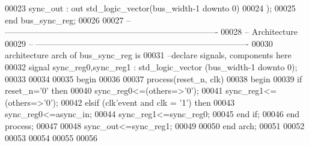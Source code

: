 \begin{DoxyCode}
00023       \textcolor{vhdlchar}{sync_out}    \textcolor{vhdlchar}{:} \textcolor{keywordflow}{out} \textcolor{comment}{std\_logic\_vector}\textcolor{vhdlchar}{(}\textcolor{vhdlchar}{bus_width}\textcolor{vhdlchar}{-}\textcolor{vhdllogic}{}\textcolor{vhdllogic}{1} \textcolor{keywordflow}{downto} \textcolor{vhdllogic}{}\textcolor{vhdllogic}{0}\textcolor{vhdlchar}{)}
00024         \textcolor{vhdlchar}{)};
00025 \textcolor{keywordflow}{end} \textcolor{vhdlchar}{bus\_sync\_reg};
00026 
00027 \textcolor{keyword}{-- ----------------------------------------------------------------------------}
00028 \textcolor{keyword}{-- Architecture}
00029 \textcolor{keyword}{-- ----------------------------------------------------------------------------}
00030 \textcolor{keywordflow}{architecture} arch \textcolor{keywordflow}{of} bus_sync_reg is
00031 \textcolor{keyword}{--declare signals,  components here}
00032 \textcolor{keywordflow}{signal} \textcolor{vhdlchar}{sync_reg0}\textcolor{vhdlchar}{,}\textcolor{vhdlchar}{sync_reg1} \textcolor{vhdlchar}{:} \textcolor{comment}{std\_logic\_vector} \textcolor{vhdlchar}{(}\textcolor{vhdlchar}{bus_width}\textcolor{vhdlchar}{-}\textcolor{vhdllogic}{}\textcolor{vhdllogic}{1} \textcolor{keywordflow}{downto} \textcolor{vhdllogic}{}\textcolor{vhdllogic}{0}\textcolor{vhdlchar}{)};
00033 
00034   
00035 \textcolor{vhdlkeyword}{begin}
00036 
00037  \textcolor{keywordflow}{process}(reset_n, clk)
00038 \textcolor{vhdlkeyword}{    begin}
00039       \textcolor{keywordflow}{if} \textcolor{vhdlchar}{reset_n}\textcolor{vhdlchar}{=}\textcolor{vhdlchar}{'}\textcolor{vhdllogic}{}\textcolor{vhdllogic}{0}\textcolor{vhdlchar}{'} \textcolor{keywordflow}{then}
00040          \textcolor{vhdlchar}{sync_reg0}\textcolor{vhdlchar}{<=}\textcolor{vhdlchar}{(}\textcolor{keywordflow}{others}\textcolor{vhdlchar}{=}\textcolor{vhdlchar}{>}\textcolor{vhdlchar}{'}\textcolor{vhdllogic}{}\textcolor{vhdllogic}{0}\textcolor{vhdlchar}{'}\textcolor{vhdlchar}{)}; 
00041          \textcolor{vhdlchar}{sync_reg1}\textcolor{vhdlchar}{<=}\textcolor{vhdlchar}{(}\textcolor{keywordflow}{others}\textcolor{vhdlchar}{=}\textcolor{vhdlchar}{>}\textcolor{vhdlchar}{'}\textcolor{vhdllogic}{}\textcolor{vhdllogic}{0}\textcolor{vhdlchar}{'}\textcolor{vhdlchar}{)};          
00042       \textcolor{keywordflow}{elsif} \textcolor{vhdlchar}{(}\textcolor{vhdlchar}{clk}\textcolor{vhdlchar}{'}\textcolor{vhdlkeyword}{event} \textcolor{keywordflow}{and} \textcolor{vhdlchar}{clk} \textcolor{vhdlchar}{=} \textcolor{vhdlchar}{'}\textcolor{vhdllogic}{}\textcolor{vhdllogic}{1}\textcolor{vhdlchar}{'}\textcolor{vhdlchar}{)} \textcolor{keywordflow}{then}
00043          \textcolor{vhdlchar}{sync_reg0}\textcolor{vhdlchar}{<=}\textcolor{vhdlchar}{async_in};
00044          \textcolor{vhdlchar}{sync_reg1}\textcolor{vhdlchar}{<=}\textcolor{vhdlchar}{sync_reg0};
00045         \textcolor{keywordflow}{end} \textcolor{keywordflow}{if};
00046     \textcolor{keywordflow}{end} \textcolor{keywordflow}{process};
00047     
00048 \textcolor{vhdlchar}{sync_out}\textcolor{vhdlchar}{<=}\textcolor{vhdlchar}{sync_reg1};
00049   
00050 \textcolor{keywordflow}{end} \textcolor{vhdlchar}{arch};   
00051 
00052 
00053 
00054 
00055 
00056 
\end{DoxyCode}
